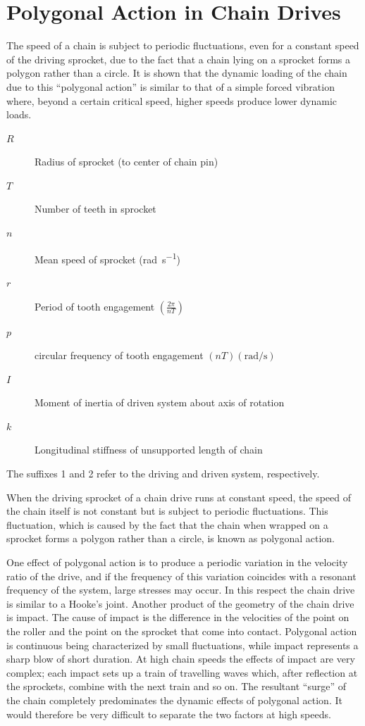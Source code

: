 \section{Polygonal Action in Chain Drives}

The speed of a chain is subject to periodic fluctuations, even for a constant speed of the driving sprocket, due to the fact that a chain lying on a sprocket forms a polygon rather than a circle. It is shown that the dynamic loading of the chain due to this ``polygonal action'' is similar to that of a simple forced vibration where, beyond a certain critical speed, higher speeds produce lower dynamic loads.

\begin{description}
\item[$R$] Radius of sprocket (to center of chain pin)
\item[$T$] Number of teeth in sprocket
\item[$n$] Mean speed of sprocket (\si{\radian\per\second})
\item[$r$] Period of tooth engagement $\left(\frac{2\pi}{nT}\right)$
\item[$p$] circular frequency of tooth engagement $\left(nT\right) (\si{\radian\per\second})$
\item[$I$] Moment of inertia of driven system about axis of rotation
\item[$k$] Longitudinal stiffness of unsupported length of chain
\end{description}

The suffixes 1 and 2 refer to the driving and driven system, respectively.

When the driving sprocket of a chain drive runs at constant speed, the speed of the chain itself is not constant but is subject to periodic fluctuations. This fluctuation, which is caused by the fact that the chain when wrapped on a sprocket forms a polygon rather than a circle, is known as polygonal action.

One effect of polygonal action is to produce a periodic variation in the velocity ratio of the drive, and if the frequency of this variation coincides with a resonant frequency of the system, large stresses may occur. In this respect the chain drive is similar to a Hooke's joint. Another product of the geometry of the chain drive is impact. The cause of impact is the difference in the velocities of the point on the roller and the point on the sprocket that come into contact. Polygonal action is continuous being characterized by small fluctuations, while impact represents a sharp blow of short duration. At high chain speeds the effects of impact are very complex; each impact sets up a train of travelling waves which, after reflection at the sprockets, combine with the next train and so on. The resultant ``surge'' of the chain completely predominates the dynamic effects of polygonal action. It would therefore be very difficult to separate the two factors at high speeds.


